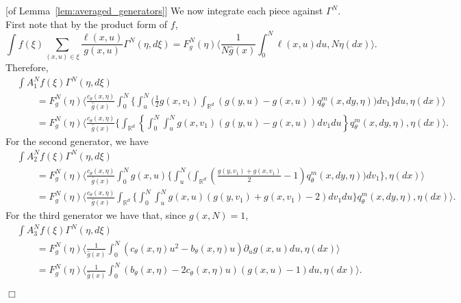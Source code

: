 \documentclass[12pt]{article}
\newenvironment {proof}{{\noindent\bf Proof }}{\hfill $\Box$ \medskip}
\def \hat{\widehat}
\newcommand{\IR}{\mathbb R}
\newcommand{\lp}{\xi}              %
\numberwithin{equation}{section}
\begin{document}
\begin{proof}[of Lemma~\ref{lem:averaged_generators}]
We now integrate each piece against $\Gamma^N$.
First note that by the product form of $f$,
$$
    \int f(\lp) \sum_{(x,u)\in\lp} \frac{\ell(x,u)}{g(x,u)} \Gamma^N(\eta,d\lp)
    =
    F_g^N(\eta) \bigg\langle
        \frac{1}{N \hat g(x)} \int_0^N \ell(x,u) du,
        N \eta(dx)
    \bigg\rangle .
$$
Therefore,
\footnotesize
\begin{align*}
&
    \int A^N_1f(\lp) \Gamma^N(\eta,d\lp) 
\\ &\qquad =
    F_g^N(\eta) \bigg\langle \frac{c_\theta(x,\eta)}{\hat g(x)} \int_0^N \Bigg\{
        \int_u^N \Bigg(
            \frac{1}{2} g(x,v_1) \int_{\IR^d}(g(y,u)-g(x,u))q^m_{\theta}(x,dy,\eta)
        \Bigg) dv_1
    \Bigg\} du, \eta(dx) \bigg \rangle
\\ &\qquad =
    F_g^N(\eta) \bigg\langle \frac{c_\theta(x,\eta)}{\hat g(x)} \Bigg\{
    \int_{\IR^d} \left\{
        \int_{0}^{N} \int_u^N g(x,v_1) (g(y,u)-g(x,u)) dv_1 du
    \right\} q^m_{\theta}(x,dy,\eta)
    , \eta(dx) \bigg \rangle .
\end{align*}
\normalsize
For the second generator, we have
\footnotesize
\begin{align*}
&
    \int A^N_2 f(\lp) \Gamma^N(\eta, d\lp)
\\ &\qquad =
    F_g^N(\eta) \bigg\langle \frac{c_\theta(x,\eta)}{\hat g(x)} \int_0^N g(x, u) \Bigg\{
        \int_u^N\Bigg(\int_{\IR^d}
        \left(\frac{g(y,v_1)+g(x,v_1)}{2}-1\right) q^m_{\theta}(x,dy,\eta)
        \Bigg)dv_1 \Bigg\}
    , \eta(dx) \bigg\rangle
\\ &\qquad =
    F_g^N(\eta) \bigg\langle \frac{c_\theta(x,\eta)}{\hat g(x)}
    \int_{\IR^d}\Bigg\{ \int_{0}^{N}
    \int_u^N g(x,u) \left(
        g(y,v_1)+g(x,v_1)-2
    \right) dv_1 du\Bigg\} q^m_{\theta}(x,dy,\eta)
    , \eta(dx) \bigg\rangle .
\end{align*}  
\normalsize
For the third generator we have that, since $g(x,N) = 1$,
\begin{align*}
&
    \int A^N_3f(\xi)\Gamma^N(\eta,d\lp)
\\ & \qquad =
    F_g^N(\eta) \bigg\langle \frac{1}{\hat g(x)}
    \int_0^N
        \left( c_\theta(x,\eta) u^2 - b_\theta(x,\eta) u \right) \partial_u g(x,u)
    du
    , \eta(dx) \bigg\rangle 
\\ & \qquad =
    F_g^N(\eta) \bigg\langle \frac{1}{\hat g(x)}
    \int_0^N
        \left( b_\theta(x,\eta) - 2 c_\theta(x,\eta) u \right) (g(x,u) - 1)
    du
    , \eta(dx) \bigg\rangle .
\end{align*}


\end{proof}
\end{document}
